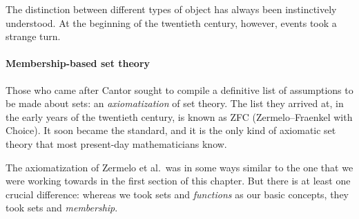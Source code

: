 The distinction between different types of object has always been
instinctively understood.  At the beginning of the twentieth century, however,
events took a strange turn.

\paragraph*{Membership-based set theory} 
% 
%
Those who came after Cantor sought to compile a definitive list of
assumptions to be made about sets: an \emph{axiomatization} of set theory.
The list they arrived at, in the early years of the twentieth century, is known
as ZFC%
%
%
(Zermelo--Fraenkel with Choice).  It soon became the standard, and
it is the only kind of axiomatic set theory that most present-day
mathematicians know.

The axiomatization of Zermelo et al.\ was in some ways similar to the one
that we were working towards in the first section of this chapter.  But
there is at least one crucial difference: whereas we took sets and
\emph{functions} as our basic concepts, they took sets and
\emph{membership}.

